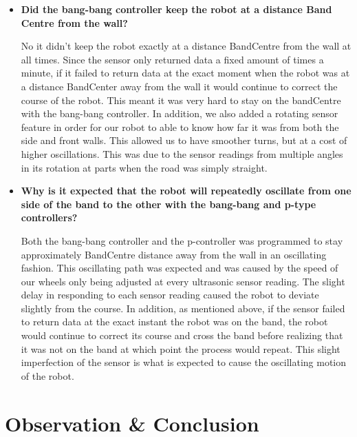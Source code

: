 \documentclass[paper=a4, fontsize=11pt]{scrartcl}
\begin{document}
\begin{itemize}

  \item \textbf{Did the bang-bang controller keep the robot at a distance Band Centre from the wall?}
  
  No it didn't keep the robot exactly at a distance BandCentre from the wall at all times. Since the sensor only returned data a fixed amount of times a minute, if it failed to return data at the exact moment when the robot was at a distance BandCenter away from the wall it would continue to correct the course of the robot. This meant it was very hard to stay on the bandCentre with the bang-bang controller. In addition, we also added a rotating sensor feature in order for our robot to able to know how far it was from both the side and front walls. This allowed us to have smoother turns, but at a cost of higher oscillations. This was due to the sensor readings from multiple angles in its rotation at parts when the road was simply straight.
  
  \item \textbf{Why is it expected that the robot will repeatedly oscillate from one side of the band to the other with the bang-bang and p-type controllers?}
  
  Both the bang-bang controller and the p-controller was programmed to stay approximately BandCentre distance away from the wall in an oscillating fashion. This oscillating path was expected and was caused by the speed of our wheels only being adjusted at every ultrasonic sensor reading. The slight delay in responding to each sensor reading caused the robot to deviate slightly from the course. In addition, as mentioned above, if the sensor failed to return data at the exact instant the robot was on the band, the robot would continue to correct its course and cross the band before realizing that it was not on the band at which point the process would repeat. This slight imperfection of the sensor is what is expected to cause the oscillating motion of the robot. 
  
\end{itemize}

\section{Observation \& Conclusion}
\end{document}
